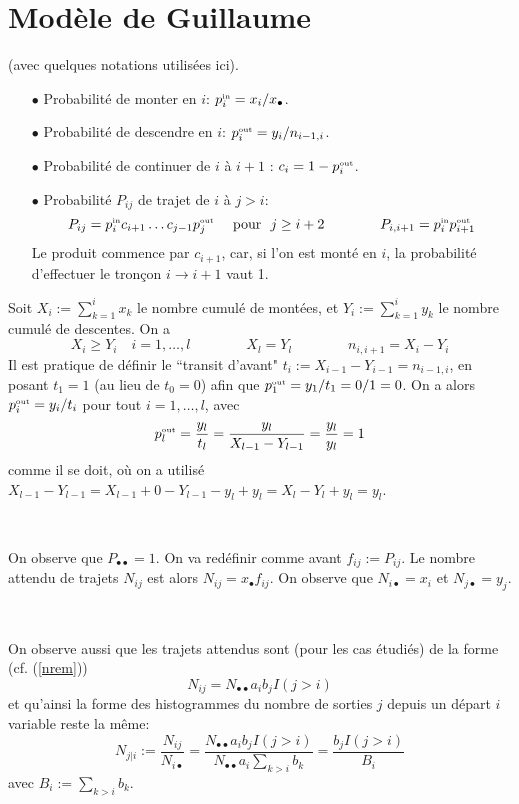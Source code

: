 \documentclass{svmult}
\begin{document}
\section{Modèle de Guillaume}
(avec quelques notations utilisées ici). 
\begin{enumerate}
  \item[$\bullet$] Probabilité de monter en $i$:  $p_i^{\mbox{\tiny in}}=x_i/x_{\bullet}$. 
    \item[$\bullet$] Probabilité de descendre en $i$: $p_i^{\mbox{\tiny out}}=y_i/n_{i-1,i}$. 
      \item[$\bullet$] Probabilité de continuer de $i$ à $i+1$ : $c_i=1-p_i^{\mbox{\tiny out}}$. 
          \item[$\bullet$] Probabilité $P_{ij}$ de trajet de $i$ à $j>i$: 
\begin{equation}
\label{ }
P_{ij}=p_i^{\mbox{\tiny in}}c_{i+1}\ldots c_{j-1}p_j^{\mbox{\tiny out}}\quad \mbox{ pour } j\ge i+2
\qquad\qquad P_{i,i+1}=p_i^{\mbox{\tiny in}}p_{i+1}^{\mbox{\tiny out}}
\end{equation}
Le produit commence par $c_{i+1}$, car, si l'on est monté en $i$, la probabilité d'effectuer le tronçon $i\to i+1$ vaut 1.
\end{enumerate}

Soit $X_i:=\sum_{k=1}^i x_k$ le nombre cumulé de montées, et $Y_i:=\sum_{k=1}^i y_k$ le nombre cumulé de descentes. On a 
\begin{equation}
\label{ }
X_i\ge Y_i\quad i=1,\ldots,l\qquad\qquad X_l=Y_l\qquad\qquad n_{i,i+1}=X_i-Y_i
\end{equation}
Il est pratique de définir le ``transit d'avant"  $t_i:=X_{i-1}-Y_{i-1}=n_{i-1,i}$, en posant $t_1=1$ (au lieu de $t_0=0$) afin que  
$p_1^{\mbox{\tiny out}}=y_1/t_1=0/1=0$. On a alors $p_i^{\mbox{\tiny out}}=y_i/t_i$ pour tout $i=1,\ldots, l$, avec 
\begin{displaymath}
p_l^{\mbox{\tiny out}}=\frac{y_l}{t_l}=\frac{y_l}{X_{l-1}-Y_{l-1}}=\frac{y_l}{y_l}=1
\end{displaymath}
comme il se doit, où on a utilisé $X_{l-1}-Y_{l-1}=X_{l-1}+0-Y_{l-1}-y_l+y_l=X_l-Y_l+y_l=y_l$. 


\

On observe que $P_{\bullet\bullet}=1$. On va redéfinir comme avant $f_{ij}:=P_{ij}$. 
Le nombre attendu de trajets $N_{ij}$ est alors $N_{ij}=x_{\bullet} f_{ij}$. On observe que $N_{i\bullet}=x_i$ et $N_{j\bullet}=y_j$.

\

On observe aussi que les trajets attendus sont (pour les cas étudiés) de la forme (cf. (\ref{nrem}))
\begin{equation}
\label{nrem2}
N_{ij}=N_{\bullet\bullet}a_ib_jI(j>i)
\end{equation}
et qu'ainsi la forme des histogrammes du nombre de sorties $j$ depuis un départ $i$ variable reste la même: 
\begin{equation}
\label{nrem3}
N_{j|i}:=\frac{N_{ij}}{N_{i\bullet}}=\frac{N_{\bullet\bullet}a_ib_jI(j>i)}{N_{\bullet\bullet}a_i\sum_{k>i}b_k}=\frac{b_jI(j>i)}{B_i}
\end{equation}
avec $B_i:=\sum_{k>i}b_k$.
\end{document}
